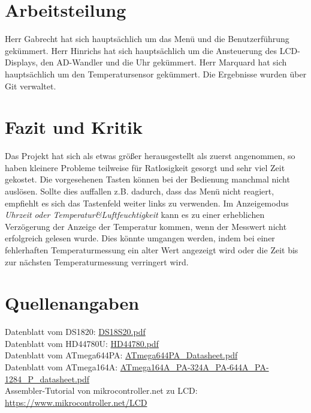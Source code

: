 \documentclass[10pt]{scrartcl}
\begin{document}
\section{Arbeitsteilung}
Herr Gabrecht hat sich hauptsächlich um das Menü und die Benutzerführung gekümmert.
Herr Hinrichs hat sich hauptsächlich um die Ansteuerung des LCD-Displays, den AD-Wandler und die Uhr gekümmert.
Herr Marquard hat sich hauptsächlich um den Temperatursensor gekümmert.
Die Ergebnisse wurden über Git verwaltet.
\section{Fazit und Kritik}
Das Projekt hat sich als etwas größer herausgestellt als zuerst angenommen, so haben kleinere Probleme teilweise für Ratlosigkeit gesorgt und sehr viel Zeit gekostet.
Die vorgesehenen Tasten können bei der Bedienung manchmal nicht auslösen. Sollte dies auffallen z.B. dadurch, dass das Menü nicht reagiert, empfiehlt es sich das Tastenfeld weiter links zu verwenden. Im Anzeigemodus \textit{Uhrzeit oder Temperatur\&Luftfeuchtigkeit} kann es zu einer erheblichen Verzögerung der Anzeige der Temperatur kommen, wenn der Messwert nicht erfolgreich gelesen wurde. Dies könnte umgangen werden, indem bei einer fehlerhaften Temperaturmessung ein alter Wert angezeigt wird oder die Zeit bis zur nächsten Temperaturmessung verringert wird.
\section{Quellenangaben}
Datenblatt vom DS1820: \href{https://datasheets.maximintegrated.com/en/ds/DS18S20.pdf}{DS18S20.pdf}\\
Datenblatt vom HD44780U: \href{https://www.sparkfun.com/datasheets/LCD/HD44780.pdf}{HD44780.pdf}\\
Datenblatt vom ATmega644PA: \href{http://ww1.microchip.com/downloads/en/DeviceDoc/Atmel-42717-ATmega644PA\_Datasheet.pdf}{ATmega644PA\_Datasheet.pdf}\\
Datenblatt vom ATmega164A: \href{https://web.archive.org/web/20170714062250/http://www.atmel.com/Images/Atmel-8272-8-bit-AVR-microcontroller-ATmega164A\_PA-324A\_PA-644A\_PA-1284\_P\_datasheet.pdf}{ATmega164A\_PA-324A\_PA-644A\_PA-1284\_P\_datasheet.pdf}\\
Assembler-Tutorial von mikrocontroller.net zu LCD: \href{https://www.mikrocontroller.net/articles/AVR-Tutorial:\_LCD\#Routinen\_zur\_LCD-Ansteuerung\_im\_4-Bit-Modus}{https://www.mikrocontroller.net/LCD}
\end{document}
